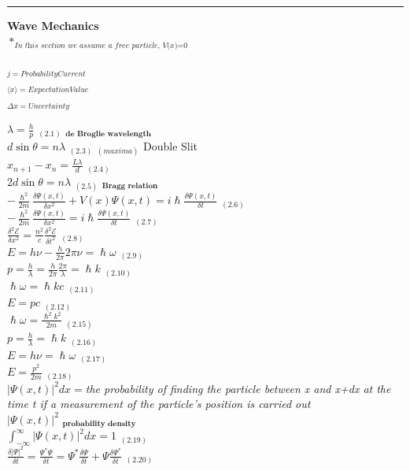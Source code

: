 \documentclass[0pt]{report}
\begin{document}
\begin{multicols}{3}
\begin{flushleft}
\noindent\rule[0.5ex]{\linewidth}{1pt}
\textbf{Wave Mechanics}\\

$*_{\textit{In this section we assume a free particle, V(x)=0}}$

\begin{multicols}{2}
$_{j=ProbabilityCurrent}$\\
$_{\langle x\rangle =ExpectationValue}$\\
$_{\Delta x=Uncertainty}$\\
\end{multicols}

$\lambda=\frac{h}{p}$ $_{(2.1)}$ $_{\textbf{de Broglie wavelength}}$\\
$d\sin\theta=n\lambda$ $_{(2.3)}$ $_{(maxima)}$ Double Slit\\
$x_{n+1}-x_n=\frac{L\lambda}{d}$ $_{(2.4)}$\\
$2d\sin\theta=n\lambda$ $_{(2.5)}$ $_{\textbf{Bragg relation}}$\\
$-\frac{\hslash^2}{2m}\frac{\delta\Psi(x,t)}{\delta x^2}+V(x)\Psi(x,t)=i\hslash\frac{\delta\Psi(x,t)}{\delta t}$ $_{(2.6)}$\\
$-\frac{\hslash^2}{2m}\frac{\delta\Psi(x,t)}{\delta x^2}=i\hslash\frac{\delta\Psi(x,t)}{\delta t}$ $_{(2.7)}$\\
$\frac{\delta^2\mathcal{E}}{\delta x^2}=\frac{n^2}{c}\frac{\delta^2\mathcal{E}}{\delta t^2}$ $_{(2.8)}$\\
$E=h\nu-\frac{h}{2\pi}2\pi\nu=\hslash\omega$ $_{(2.9)}$\\
$p=\frac{h}{\lambda}=\frac{h}{2\pi}\frac{2\pi}{\lambda}=\hslash k$ $_{(2.10)}$\\
$\hslash\omega=\hslash kc$ $_{(2.11)}$\\
$E=pc$ $_{(2.12)}$\\
$\hslash\omega=\frac{\hslash^2k^2}{2m}$ $_{(2.15)}$\\
$p=\frac{h}{\lambda}=\hslash k$ $_{(2.16)}$\\
$E=h\nu=\hslash\omega$ $_{(2.17)}$\\
$E=\frac{p^2}{2m}$ $_{(2.18)}$\\
$|\Psi(x,t)|^2dx=$\textit{the probability of finding the particle between x and x+dx at the time t if a measurement of the particle's position is carried out}\\
$|\Psi(x,t)|^2$ $_{\textbf{probability density}}$\\
$\int_{-\infty}^{\infty}|\Psi(x,t)|^2dx=1$ $_{(2.19)}$\\
$\frac{\delta|\Psi|^2}{\delta t}=\frac{\Psi^*\Psi}{\delta t}=\Psi^*\frac{\delta \Psi}{\delta t}+\Psi\frac{\delta \Psi^*}{\delta t}$ $_{(2.20)}$\\

\end{flushleft}
\end{multicols}
\end{document}
